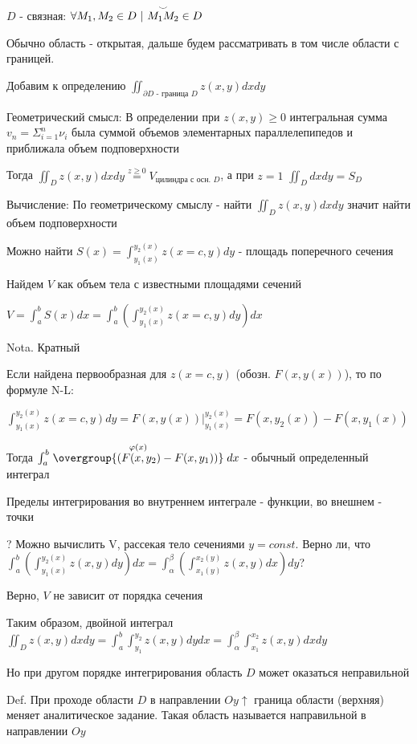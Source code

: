 \documentclass[12pt]{article}
\begin{document}
    $D$ - связная: $\forall M_1, M_2 \in D \ | \ \overset{\LARGE\smile}{M_1 M_2} \in D$

    Обычно область - открытая, дальше будем рассматривать в том числе области с границей.

    Добавим к определению $\iint_{\partial D \text{ - граница } D} z(x, y) dx dy$

    Геометрический смысл: В определении при $z(x, y) \geq 0$ интегральная сумма $v_n = \Sigma_{i=1}^n \nu_i$ была суммой объемов элементарных параллелепипедов и приближала объем подповерхности

    Тогда $\iint_D z(x, y) dx dy \stackrel{z \geq 0}{=} V_{\text{цилиндра с осн. } D}$, а при $z = 1$ $\iint_D dx dy = S_D$

    Вычисление: По геометрическому смыслу - найти $\iint_D z(x, y) dx dy$ значит найти объем подповерхности

    Можно найти $S(x) = \int^{y_2(x)}_{y_1(x)} z(x = c, y) dy$ - площадь поперечного сечения

    Найдем $V$ как объем тела с известными площадями сечений

    $V = \int^b_a S(x) dx = \int_a^b \left(\int^{y_2(x)}_{y_1(x)} z(x = c, y) dy\right) dx$

    Nota. Кратный

    Если найдена первообразная для $z(x = c, y)$ (обозн. $F(x, y(x))$), то по формуле N-L:

    $\int^{y_2(x)}_{y_1(x)} z(x = c, y) dy = F(x, y(x)) \Big|^{y_2(x)}_{y_1(x)} = F(x, y_2(x)) - F(x, y_1(x))$

    Тогда $\int^b_a \stackrel{\varphi(x)}{\overgroup{(F(x, y_2) - F(x, y_1))}} dx$ - обычный определенный интеграл

    Пределы интегрирования во внутреннем интеграле - функции, во внешнем - точки

    ? Можно вычислить V, рассекая тело сечениями $y = const$. Верно ли, что $\int_a^b \left(\int_{y_1(x)}^{y_2(x)} z(x, y) dy\right) dx = \int_\alpha^\beta \left(\int_{x_1(y)}^{x_2(y)} z(x, y) dx\right) dy$?

    Верно, $V$ не зависит от порядка сечения

    Таким образом, двойной интеграл $\iint_D z(x, y) dxdy = \int_a^b \int_{y_1}^{y_2} z(x, y) dydx = \int_\alpha^\beta \int_{x_1}^{x_2} z(x, y) dxdy$

    Но при другом порядке интегрирования область $D$ может оказаться неправильной

    Def. При проходе области $D$ в направлении $Oy \uparrow$ граница области (верхняя) меняет аналитическое задание. Такая область называется направильной в направлении $Oy$
\end{document}
